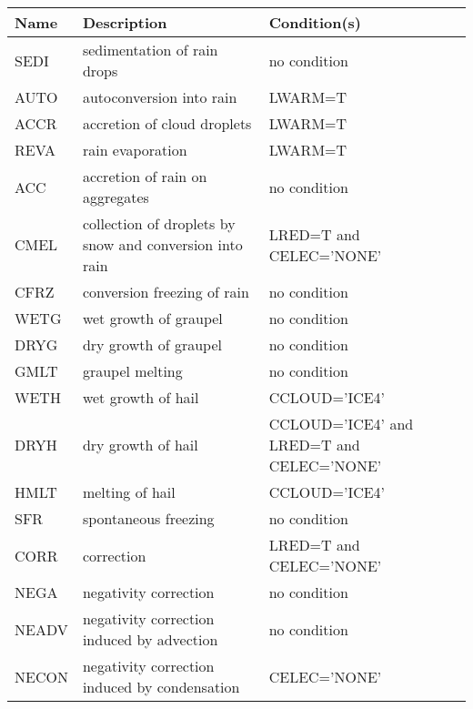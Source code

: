 \begin{longtable} {|p{}|p{}|p{}|}
\hline
Name & Description & Condition(s) \\
\hline \hline
\endhead
SEDI   & sedimentation of rain drops                             & no condition \\\hline
AUTO   & autoconversion into rain                                & LWARM=T \\\hline
ACCR   & accretion of cloud droplets                             & LWARM=T \\\hline
REVA   & rain evaporation                                        & LWARM=T \\\hline
ACC    & accretion of rain on aggregates                         & no condition \\\hline
CMEL   & collection of droplets by snow and conversion into rain & LRED=T and CELEC='NONE' \\\hline
CFRZ   & conversion freezing of rain                             & no condition \\\hline
WETG   & wet growth of graupel                                   & no condition \\\hline
DRYG   & dry growth of graupel                                   & no condition \\\hline
GMLT   & graupel melting                                         & no condition \\\hline
WETH   & wet growth of hail                                      & CCLOUD='ICE4' \\\hline
DRYH   & dry growth of hail                                      & CCLOUD='ICE4' and LRED=T and CELEC='NONE' \\\hline
HMLT   & melting of hail                                         & CCLOUD='ICE4' \\\hline
SFR    & spontaneous freezing                                    & no condition \\\hline
CORR   & correction                                              & LRED=T and CELEC='NONE' \\\hline
NEGA   & negativity correction                                   & no condition \\\hline
NEADV  & negativity correction induced by advection              & no condition \\\hline
NECON  & negativity correction induced by condensation           & CELEC='NONE' \\\hline
\end{longtable}


